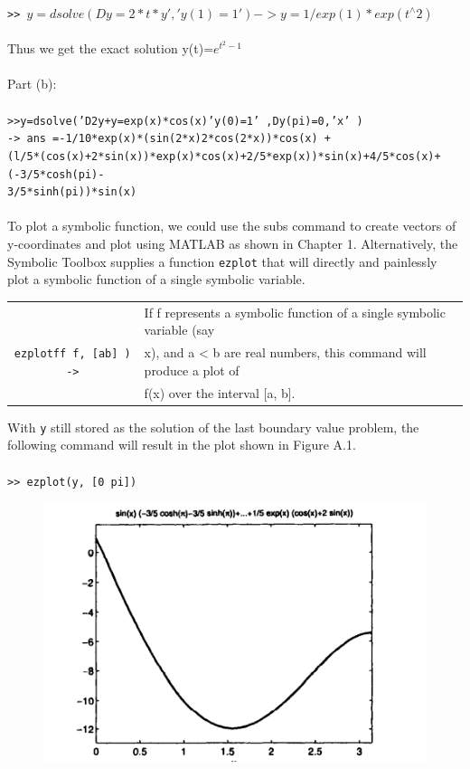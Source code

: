 \documentclass[../main.tex]{subfiles}
\begin{document}
\\
\texttt{>> $y=dsolve ( Dy=2*t*y' , ' y (1) =1') ->y =1/exp(1)*exp(t^{\wedge}2)$}\\
\\
Thus we get the exact solution y(t)=$e^{t^2-1}$
\\
\\
Part (b): 
\\
\\
\texttt{>>y=dsolve('D2y+y=exp(x)*cos(x)'y(0)=1' ,Dy(pi)=0,'x' ) }\\
\texttt{-> ans =-1/10*exp(x)*(sin(2*x)2*cos(2*x))*cos(x) +}\\
\texttt{(l/5*(cos(x)+2*sin(x))*exp(x)*cos(x)+2/5*exp(x))*sin(x)+4/5*cos(x)+(-3/5*cosh(pi)-}\\
\texttt{3/5*sinh(pi))*sin(x)}
\\
\\
To plot a symbolic function, we could use the subs command to create vectors of 
y-coordinates and plot using MATLAB as shown in Chapter 1. Alternatively, the 
Symbolic Toolbox supplies a function \texttt{ezplot} that will directly and painlessly 
plot a symbolic function of a single symbolic variable.
\begin{center}
\begin{tabular}{|c|l|}
\hline
&If f represents a symbolic function of a single symbolic variable (say \\
\texttt{ezplotff f, [ab] ) ->}&x), and a < b are real numbers, this command will produce a plot of\\
&f(x) over the interval [a, b]. \\
\hline
\end{tabular}
\end{center}
With \texttt{y} still stored as the solution of the last boundary value problem, the following 
command will result in the plot shown in Figure A.1.
 \\
 \\
\texttt{>> ezplot(y, [0 pi])}
\begin{figure}[H]
\includegraphics[width=0.9\linewidth]{40}
	\centering
	\label{pfig:ch13_40}
\end{figure}
\end{document}
